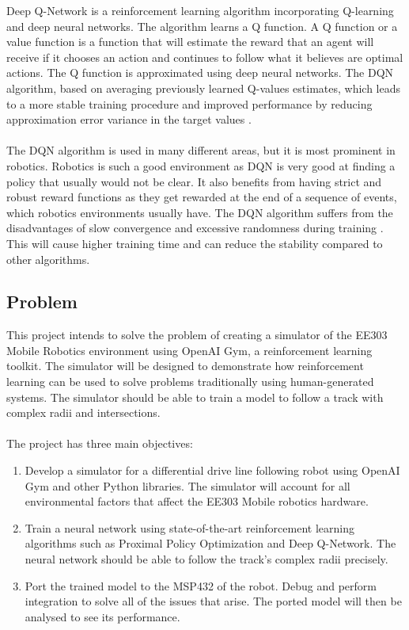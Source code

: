\documentclass[a4paper,12pt]{article}
\begin{document}
Deep Q-Network is a reinforcement learning algorithm incorporating Q-learning and deep neural networks. The algorithm learns a Q function. A Q function or a value function is a function that will estimate the reward that an agent will receive if it chooses an action and continues to follow what it believes are optimal actions. The Q function is approximated using deep neural networks. The DQN algorithm, based on averaging previously learned Q-values estimates, which leads to a more stable training procedure and improved performance by reducing approximation error variance in the target values \cite{Anschel}.
\\\\
The DQN algorithm is used in many different areas, but it is most prominent in robotics. Robotics is such a good environment as DQN is very good at finding a policy that usually would not be clear. It also benefits from having strict and robust reward functions as they get rewarded at the end of a sequence of events, which robotics environments usually have. The DQN algorithm suffers from the disadvantages of slow convergence and excessive randomness during training \cite{YangMulti}. This will cause higher training time and can reduce the stability compared to other algorithms. 
\subsection{Problem}

This project intends to solve the problem of creating a simulator of the EE303 Mobile Robotics environment using OpenAI Gym, a reinforcement learning toolkit. The simulator will be designed to demonstrate how reinforcement learning can be used to solve problems traditionally using human-generated systems. The simulator should be able to train a model to follow a track with complex radii and intersections.
\\\\
The project has three main objectives:

\begin{enumerate}
  \item Develop a simulator for a differential drive line following robot using OpenAI Gym and other Python libraries. The simulator will account for all environmental factors that affect the EE303 Mobile robotics hardware. 

  \item Train a neural network using state-of-the-art reinforcement learning algorithms such as Proximal Policy Optimization and Deep Q-Network. The neural network should be able to follow the track's complex radii precisely.
  \item Port the trained model to the MSP432 of the robot. Debug and perform integration to solve all of the issues that arise. The ported model will then be analysed to see its performance.

\end{enumerate}
\end{document}
